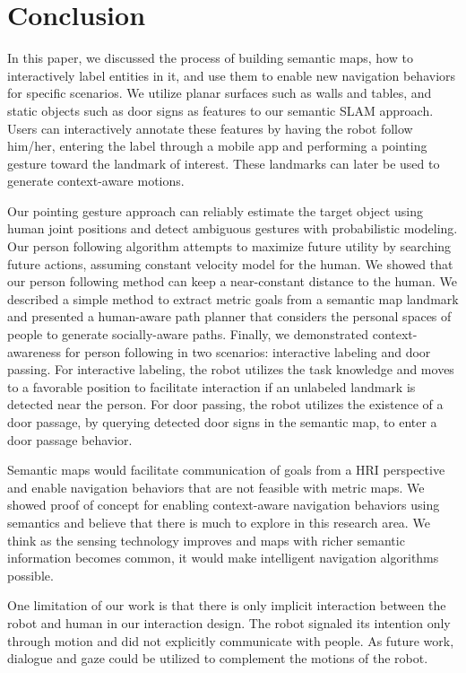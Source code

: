 \documentclass{tADR2e}
\begin{document}
\section{Conclusion}
\label{sec:conclusions}

In this paper, we discussed the process of building semantic maps, how to interactively label entities in it, and use them to enable new navigation behaviors for specific scenarios. We utilize planar surfaces such as walls and tables, and static objects such as door signs as features to our semantic SLAM approach. Users can interactively annotate these features by having the robot follow him/her, entering the label through a mobile app and performing a pointing gesture toward the landmark of interest. These landmarks can later be used to generate context-aware motions.

Our pointing gesture approach can reliably estimate the target object using human joint positions and detect ambiguous gestures with probabilistic modeling. Our person following algorithm attempts to maximize future utility by searching future actions, assuming constant velocity model for the human. We showed that our person following method can keep a near-constant distance to the human. We described a simple method to extract metric goals from a semantic map landmark and presented a human-aware path planner that considers the personal spaces of people to generate socially-aware paths. Finally, we demonstrated context-awareness for person following in two scenarios: interactive labeling and door passing. For interactive labeling, the robot utilizes the task knowledge and moves to a favorable position to facilitate interaction if an unlabeled landmark is detected near the person. For door passing, the robot utilizes the existence of a door passage, by querying detected door signs in the semantic map, to enter a door passage behavior.

Semantic maps would facilitate communication of goals from a HRI perspective and enable navigation behaviors that are not feasible with metric maps. We showed proof of concept for enabling context-aware navigation behaviors using semantics and believe that there is much to explore in this research area. We think as the sensing technology improves and maps with richer semantic information becomes common, it would make intelligent navigation algorithms possible.

One limitation of our work is that there is only implicit interaction between the robot and human in our interaction design. The robot signaled its intention only through motion and did not explicitly communicate with people. As future work, dialogue and gaze could be utilized to complement the motions of the robot. 
\end{document}
